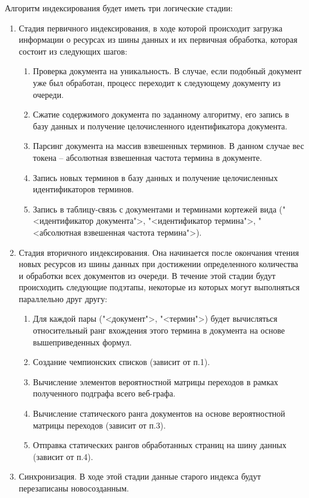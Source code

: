 Алгоритм индексирования будет иметь три логические стадии:
\begin{enumerate}
\item Стадия первичного индексирования, в ходе которой происходит загрузка информации о ресурсах из шины данных и их первичная обработка, которая состоит из следующих шагов:
\begin{enumerate}
\item Проверка документа на уникальность. В случае, если подобный документ уже был обработан, процесс переходит к следующему документу из очереди.
\item Сжатие содержимого документа по заданному алгоритму, его запись в базу данных и получение целочисленного идентификатора документа.
\item Парсинг документа на массив взвешенных терминов. В данном случае вес токена -- абсолютная взвешенная частота термина в документе.
\item Запись новых терминов в базу данных и получение целочисленных идентификаторов терминов.
\item Запись в таблицу-связь с документами и терминами кортежей вида ("<идентификатор документа">, "<идентификатор термина">, "<абсолютная взвешенная частота термина">).
\end{enumerate}
\item Стадия вторичного индексирования. Она начинается после окончания чтения новых ресурсов из шины данных при достижении определенного количества и обработки всех документов из очереди. В течение этой стадии будут происходить следующие подэтапы, некоторые из которых могут выполняться параллельно друг другу:
\begin{enumerate}
\item Для каждой пары ("<документ">, "<термин">) будет вычисляться относительный ранг вхождения этого термина в документа на основе вышеприведенных формул.
\item Создание чемпионских списков (зависит от п.1).
\item Вычисление элементов вероятностной матрицы переходов в рамках полученного подграфа всего веб-графа.
\item Вычисление статического ранга документов на основе вероятностной матрицы переходов (зависит от п.3).
\item Отправка статических рангов обработанных страниц на шину данных (зависит от п.4).
\end{enumerate}
\item Синхронизация. В ходе этой стадии данные старого индекса будут перезаписаны новосозданным.
\end{enumerate}

